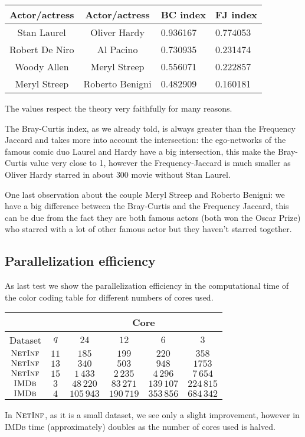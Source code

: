 	\begin{table}[h]
		\centering
		\begin{tabular}{c|c|l|l}
			Actor/actress & Actor/actress & BC index & FJ index\\ 
			\hline
			Stan Laurel & Oliver Hardy & 0.936167 & 0.774053 \\
			Robert De Niro & Al Pacino & 0.730935 & 0.231474\\
			Woody Allen & Meryl Streep & 0.556071 & 0.222857\\
			Meryl Streep & Roberto Benigni & 0.482909 & 0.160181\\
		\end{tabular}
	\end{table}

	The values respect the theory very faithfully for many reasons.
	
	The Bray-Curtis index, as we already told, is always greater than the Frequency Jaccard and takes more into account the intersection:
	the ego-networks of the famous comic duo Laurel and Hardy have a big intersection, this make the Bray-Curtis value very close to 1, however the Frequency-Jaccard is much smaller as Oliver Hardy starred in about $300$ movie without Stan Laurel.
	
	One last observation about the couple Meryl Streep and Roberto Benigni: we have a big difference between the Bray-Curtis and the Frequency Jaccard, this can be due from the fact they are both famous actors (both won the Oscar Prize) who starred with a lot of other famous actor but they haven't starred together.
	
	\subsection*{Parallelization efficiency}
	
	As last test we show the parallelization efficiency in the computational time of the color coding table for different numbers of cores used.
	
\begin{table}[h]
	\centering
	\begin{tabular}{|c|c|c|c|c|c|}
		\cline{3-6}
		\multicolumn{2}{c}{} & \multicolumn{4}{|c|}{ Core } \\ 
		\hline
		Dataset         & $q$ & $24$ & $12$ & $6$ & $3$  \\ \hline\hline
		
		$\textsc{NetInf}$ & $11$ & $185$ & $199$ & $220$ & $358$  \\  \hline
		$\textsc{NetInf}$ & $13$ & $340$ & $503$ & $948$ & $1753$  \\  \hline
		$\textsc{NetInf}$ & $15$ & $1\,433$ & $2\,235$ & $4\,296$ & $7\,654$  \\  \hline  \hline
		$\textsc{IMDb}$ & $3$ &  $48\,220$ &  $83\,271$ & $139\,107$ & $224\,815$  \\  \hline
		$\textsc{IMDb}$ & $4$ & $105\,943$ & $190\,719$ & $353\,856$ & $684\,342$  \\  \hline

	\end{tabular}
\end{table}

In $\textsc{NetInf}$, as it is a small dataset, we see only a slight improvement, 
however in \textsc{IMDb} time (approximately) doubles as the number of cores used is halved.